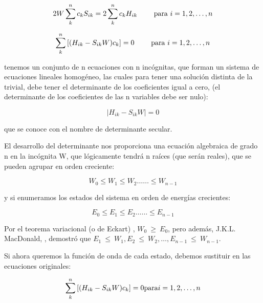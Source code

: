 \documentclass[a4paper,openright,12pt, oneside]{book}
\begin{document}
\begin{displaymath}2 W \sum^{n}_{k} c_{k} S_{ik} = 2 \sum^{n}_{k} c_{k} H_{ik}\qquad \hbox{
para }i = 1,2,\ldots ,n \end{displaymath}

\begin{displaymath}\sum^{n}_{k} \left[(H_{ik} - S_{ik} W ) c_{k} \right] = 0 \qquad
\hbox{ para } i = 1,2,\ldots ,n \end{displaymath}

tenemos un conjunto de n ecuaciones con n inc\'ognitas, que forman un sistema de ecuaciones lineales homog\'eneo, las cuales para tener una soluci\'on distinta de la trivial, debe tener el determinante de los coeficientes igual a cero, (el determinante de los coeficientes de las n variables debe ser nulo):



\begin{displaymath}\mid H_{ik} - S_{ik} W\mid = 0 \end{displaymath}

que se conoce con el nombre de determinante secular.

El desarrollo del determinante nos proporciona una ecuaci\'on algebraica de grado n en la inc\'ognita W, que l\'ogicamente tendr\'a n ra\'ices (que ser\'an reales), que se pueden agrupar en orden creciente:



\begin{displaymath}W_{0} \le W_{1} \le W_{2} \ldots \ldots \le W_{n-1} \end{displaymath}

y si enumeramos los estados del sistema en orden de energías crecientes:

\begin{displaymath}E_{0} \le E_{1} \le E_{2} \ldots \ldots \le E_{n-1} \end{displaymath}

Por el teorema variacional (o de Eckart) ,  $W_{0}~\ge ~E_{0}$, pero adem\'as, J.K.L. MacDonald, \cite{macdonald}, demostr\'o que  $E_{1}~\le ~W_{1}, E_{2}~\le ~W_{2},
\ldots , E_{n-1}~\le ~W_{n-1}$.

Si ahora queremos la funci\'on de onda de cada estado, debemos sustituir en las ecuaciones originales:

\begin{displaymath}
\sum^{n}_{k} \left[{(H_{ik} - S_{ik} W) c_{k}}\right] =
0\hbox{para}i = 1,2,\ldots ,n
\end{displaymath}
\end{document}
